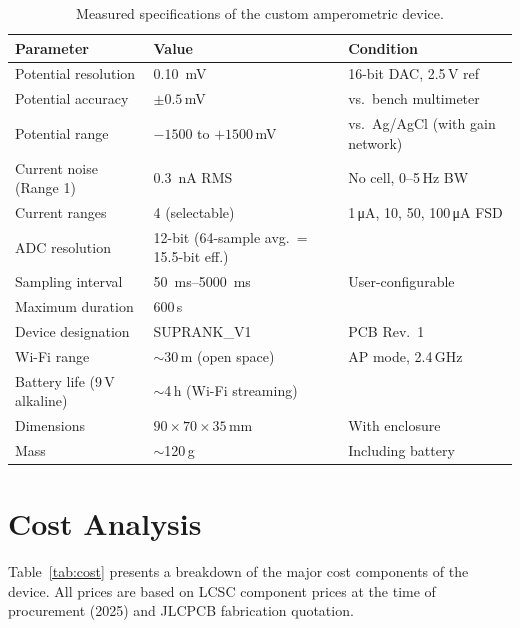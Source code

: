 \begin{table}[H]
\centering
\caption{Measured specifications of the custom amperometric device.}
\label{tab:device_specs}
\begin{tabular}{@{}lll@{}}
\toprule
\textbf{Parameter} & \textbf{Value} & \textbf{Condition} \\
\midrule
Potential resolution         & \SI{0.10}{\milli\volt} & 16-bit DAC, 2.5\,V ref \\
Potential accuracy           & $\pm 0.5$\,mV & vs.\ bench multimeter \\
Potential range              & $-1500$ to $+1500$\,mV & vs.\ Ag/AgCl (with gain network) \\
Current noise (Range 1)      & \SI{0.3}{\nano\ampere} RMS & No cell, 0--5\,Hz BW \\
Current ranges               & 4 (selectable) & 1\,\si{\micro\ampere}, 10, 50, 100\,\si{\micro\ampere} FSD \\
ADC resolution               & 12-bit (64-sample avg.\ = 15.5-bit eff.) & \\
Sampling interval            & \SIrange{50}{5000}{\milli\second} & User-configurable \\
Maximum duration             & 600\,s & \\
Device designation           & SUPRANK\_V1 & PCB Rev.\ 1 \\
Wi-Fi range                  & $\sim$30\,m (open space) & AP mode, 2.4\,GHz \\
Battery life (9\,V alkaline) & $\sim$4\,h (Wi-Fi streaming) & \\
Dimensions                   & $90 \times 70 \times 35$\,mm & With enclosure \\
Mass                         & $\sim$120\,g & Including battery \\
\bottomrule
\end{tabular}
\end{table}

\section{Cost Analysis}
\label{sec:cost}

Table~\ref{tab:cost} presents a breakdown of the major cost components of the device. All prices are based on LCSC component prices at the time of procurement (2025) and JLCPCB fabrication quotation.

